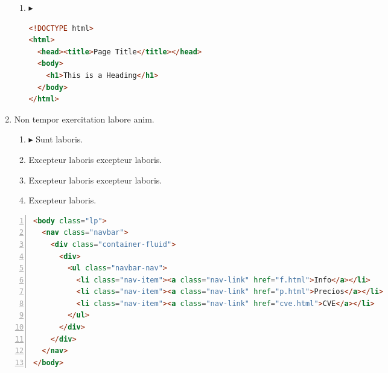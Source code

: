 \documentclass[a4paper,12pt]{article}
\begin{document}
\begin{enumerate}[label=\textbf{\arabic*.}]
\begin{enumerate}
		\item $\blacktriangleright$  \hfill \vspace*{-7mm}
    \begin{lstlisting}[language=HTML]
<!DOCTYPE html>
<html>
  <head><title>Page Title</title></head>
  <body>
    <h1>This is a Heading</h1>
  </body>
</html>
    \end{lstlisting}
    
	\end{enumerate}

\item Non tempor exercitation labore anim.
\begin{multicols}{2}
	\begin{enumerate}
		\item $\blacktriangleright$  Sunt laboris.
    
		\item  Excepteur laboris excepteur laboris.
  
		\item  Excepteur laboris excepteur laboris.
    
		\item  Excepteur laboris.
    
	\end{enumerate}

\end{multicols}
\end{enumerate}

\newpage
\begin{lstlisting}[language=HTML, caption={Documento en HTML}, label={lst:1}, numbers=left]
<body class="lp">
  <nav class="navbar">
    <div class="container-fluid">
      <div>
        <ul class="navbar-nav">
          <li class="nav-item"><a class="nav-link" href="f.html">Info</a></li>
          <li class="nav-item"><a class="nav-link" href="p.html">Precios</a></li>
          <li class="nav-item"><a class="nav-link" href="cve.html">CVE</a></li>
        </ul>
      </div>
    </div>
  </nav>
</body>
\end{lstlisting}
\end{document}
